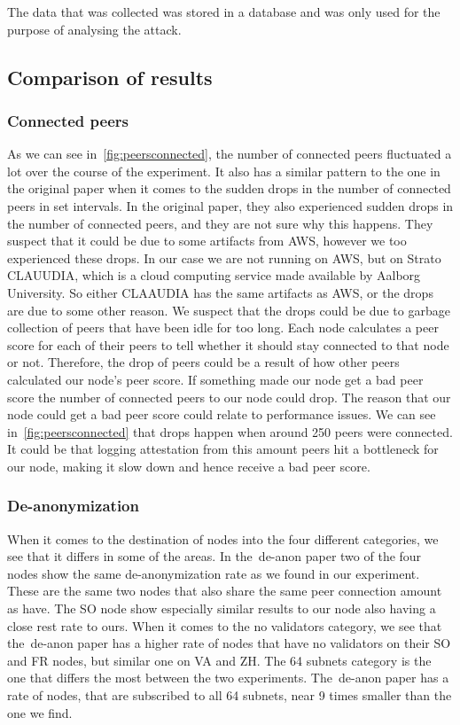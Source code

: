 The data that was collected was stored in a database and was only used for the purpose of analysing the attack.

\subsection{Comparison of results}\label{subsec:res-comparison}

\subsubsection{Connected peers}\label{subsubsec:connected-peers}
As we can see in~\autoref{fig:peersconnected}, the number of connected peers fluctuated a lot over the course of the experiment.
It also has a similar pattern to the one in the original paper when it comes to the sudden drops in the number of connected peers in set intervals.
In the original paper, they also experienced sudden drops in the number of connected peers, and they are not sure why this happens.
They suspect that it could be due to some artifacts from AWS, however we too experienced these drops.
In our case we are not running on AWS, but on Strato CLAUUDIA, which is a cloud computing service made available by Aalborg University.
So either CLAAUDIA has the same artifacts as AWS, or the drops are due to some other reason.
We suspect that the drops could be due to garbage collection of peers that have been idle for too long.
Each node calculates a peer score for each of their peers to tell whether it should stay connected to that node or not.
Therefore, the drop of peers could be a result of how other peers calculated our node's peer score.
If something made our node get a bad peer score the number of connected peers to our node could drop.
The reason that our node could get a bad peer score could relate to performance issues.
We can see in~\autoref{fig:peersconnected} that drops happen when around 250 peers were connected.
It could be that logging attestation from this amount peers hit a bottleneck for our node, making it slow down and hence receive a bad peer score.

\subsubsection{De-anonymization}\label{subsubsec:de-anonymization}
When it comes to the destination of nodes into the four different categories, we see that it differs in some of the areas.
In the~\gls{de-anon paper} two of the four nodes show the same de-anonymization rate as we found in our experiment.
These are the same two nodes that also share the same peer connection amount as have.
The SO node show especially similar results to our node also having a close rest rate to ours.
When it comes to the no validators category, we see that the~\gls{de-anon paper} has a higher rate of nodes that have no validators on their SO and FR nodes, but similar one on VA and ZH.
The 64 subnets category is the one that differs the most between the two experiments.
The~\gls{de-anon paper} has a rate of nodes, that are subscribed to all 64 subnets, near 9 times smaller than the one we find.


